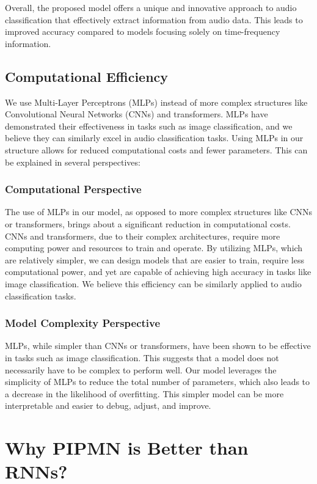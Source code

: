 \documentclass[runningheads]{llncs}
\begin{document}
Overall, the proposed model offers a unique and innovative approach to audio classification that effectively extract information from audio data. This leads to improved accuracy compared to models focusing solely on time-frequency information. 



\subsection{Computational Efficiency} We use Multi-Layer Perceptrons (MLPs) instead of more complex structures like Convolutional Neural Networks (CNNs) and transformers. MLPs have demonstrated their effectiveness in tasks such as image classification, and we believe they can similarly excel in audio classification tasks. Using MLPs in our structure allows for reduced computational costs and fewer parameters. This can be explained in several perspectives: 

\subsubsection{Computational Perspective} The use of MLPs in our model, as opposed to more complex structures like CNNs or transformers, brings about a significant reduction in computational costs. CNNs and transformers, due to their complex architectures, require more computing power and resources to train and operate. By utilizing MLPs, which are relatively simpler, we can design models that are easier to train, require less computational power, and yet are capable of achieving high accuracy in tasks like image classification. We believe this efficiency can be similarly applied to audio classification tasks.

\subsubsection{Model Complexity Perspective} MLPs, while simpler than CNNs or transformers, have been shown to be effective in tasks such as image classification. This suggests that a model does not necessarily have to be complex to perform well. Our model leverages the simplicity of MLPs to reduce the total number of parameters, which also leads to a decrease in the likelihood of overfitting. This simpler model can be more interpretable and easier to debug, adjust, and improve.

\section{Why PIPMN is Better than RNNs?}
\end{document}
